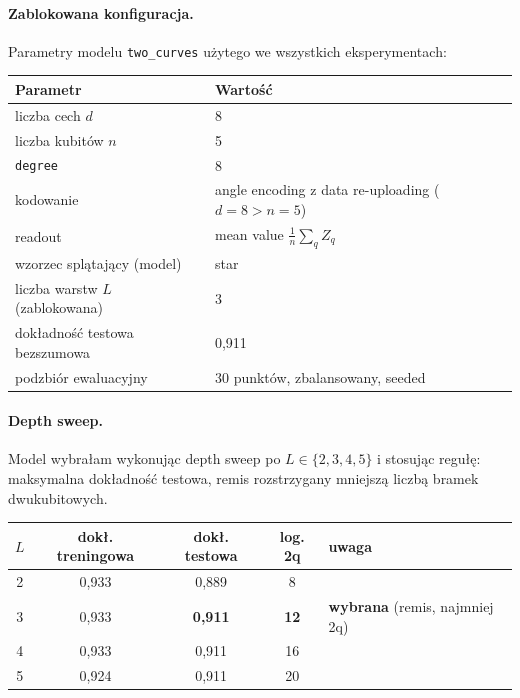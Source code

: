 \documentclass[11pt,a4paper]{article}
\begin{document}
\paragraph{Zablokowana konfiguracja.} Parametry modelu \texttt{two\_curves} użytego we
wszystkich eksperymentach:

\begin{center}
\begin{tabular}{@{}ll@{}}
\toprule
\textbf{Parametr} & \textbf{Wartość} \\
\midrule
liczba cech $d$              & 8 \\
liczba kubitów $n$           & 5 \\
\texttt{degree}              & 8 \\
kodowanie                    & angle encoding z data re-uploading ($d=8 > n=5$) \\
readout                      & mean value $\frac{1}{n}\sum_q Z_q$ \\
wzorzec splątający (model)   & star \\
liczba warstw $L$ (zablokowana) & 3 \\
dokładność testowa bezszumowa & 0,911 \\
podzbiór ewaluacyjny         & 30 punktów, zbalansowany, seeded \\
\bottomrule
\end{tabular}
\end{center}


\paragraph{Depth sweep.} Model wybrałam wykonując depth sweep po $L \in \{2,3,4,5\}$
i stosując regułę: maksymalna dokładność testowa, remis rozstrzygany mniejszą liczbą bramek
dwukubitowych.

\begin{center}
\begin{tabular}{@{}ccccl@{}}
\toprule
$L$ & dokł. treningowa & dokł. testowa & log. 2q & uwaga \\
\midrule
2 & 0,933 & 0,889 & 8  & \\
3 & 0,933 & \textbf{0,911} & \textbf{12} & \textbf{wybrana} (remis, najmniej 2q) \\
4 & 0,933 & 0,911 & 16 & \\
5 & 0,924 & 0,911 & 20 & \\
\bottomrule
\end{tabular}
\end{center}
\end{document}
